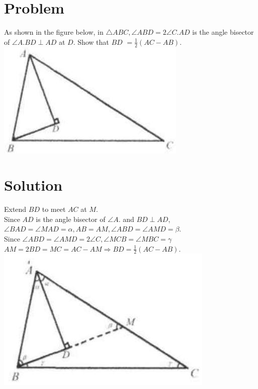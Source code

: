\documentclass{article}
\begin{document}
\section*{Problem}
As shown in the figure below, in \(\triangle A B C, \angle A B D=2 \angle C . A D\) is the angle bisector of \(\angle A . B D \perp A D\) at \(D\). Show that \(B D\) \(=\frac{1}{2}(A C-A B)\).\\
\centering
\includegraphics[width=\textwidth]{images/065(2).jpg}

\section*{Solution}
Extend \(B D\) to meet \(A C\) at \(M\).\\
Since \(A D\) is the angle bisector of \(\angle A\). and \(B D \perp A D\), \(\angle B A D=\angle M A D=\alpha, A B=A M, \angle A B D=\angle A M D=\beta\).\\
Since \(\angle A B D=\angle A M D=2 \angle C, \angle M C B=\angle M B C=\gamma\) \(A M=2 B D=M C=A C-A M \Rightarrow B D=\frac{1}{2}(A C-A B)\).\\
\centering
\includegraphics[width=\textwidth]{images/069(1).jpg}
\end{document}
